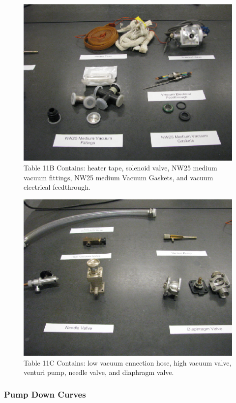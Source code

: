 \documentclass{book}
\begin{document}
\begin{figure}[H]
\includegraphics[scale=0.9]{Museum-Pieces-Table11B}
\caption[align=left]{Table 11B Contains: heater tape, solenoid valve, NW25 medium vacuum fittings, NW25 medium Vacuum Gaskets, and vacuum electrical feedthrough.}
\end{figure}

\begin{figure}[H]
\includegraphics[scale=0.9]{Museum-Pieces-Table11C}
\caption[align=left]{Table 11C Contains: low vacuum cnnection hose, high vacuum valve, venturi pump, needle valve, and diaphragm valve.}
\end{figure}

\subsubsection{Pump Down Curves}
\end{document}
